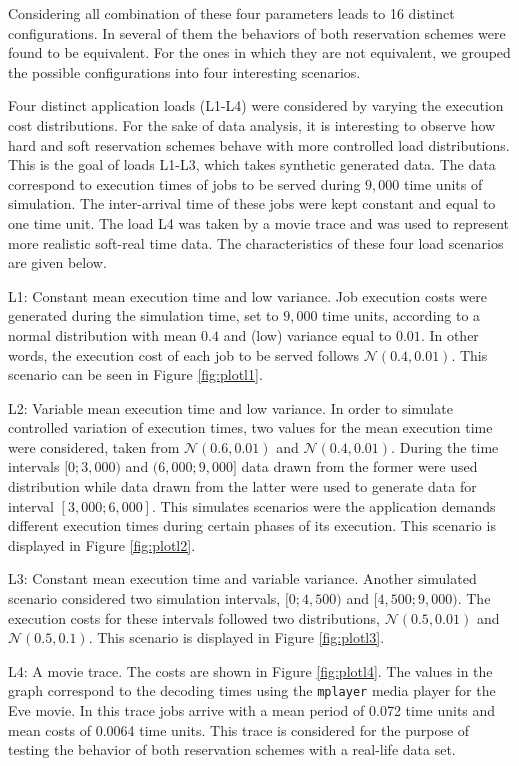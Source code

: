 \documentclass[times, 10pt,twocolumn]{article}
\begin{document}
Considering all combination of these four parameters leads to 16
distinct configurations. In several of them the behaviors of both
reservation schemes were found to be equivalent.  For the ones in
which they are not equivalent, we grouped the possible configurations
into four interesting scenarios.

\label{sec:charact-server-load}

Four distinct application loads (L1-L4) were considered by varying the
execution cost distributions.  For the sake of data analysis, it is
interesting to observe how hard and soft reservation schemes behave
with more controlled load distributions. This is the goal of loads
L1-L3, which takes synthetic generated data. The data correspond to
execution times of jobs to be served during $9,000$ time units of
simulation.  The inter-arrival time of these jobs were kept constant
and equal to one time unit.  The load L4 was taken by a movie trace
and was used to represent more realistic soft-real time data. The
characteristics of these four load scenarios are given below.

\begin{description}
\item L1: Constant mean execution time and low variance. Job execution
  costs were generated during the simulation time, set to $9,000$ time
  units, according to a normal distribution with mean $0.4$ and (low)
  variance equal to $0.01$. In other words, the execution cost of each
  job to be served follows $\mathcal{N}(0.4,0.01)$. This scenario can
  be seen in Figure \ref{fig:plotl1}.
\item L2: Variable mean execution time and low variance.  In order to
  simulate controlled variation of execution times, two values for the
  mean execution time were considered, taken from
  $\mathcal{N}(0.6,0.01)$ and $\mathcal{N}(0.4,0.01)$. During the time
  intervals $[0;3,000)$ and $(6,000;9,000]$ data drawn from the former
  were used distribution while data drawn from the latter were used to
  generate data for interval $[3,000;6,000]$. This simulates scenarios
  were the application demands different execution times during
  certain phases of its execution. This scenario is displayed in
  Figure \ref{fig:plotl2}.
\item L3: Constant mean execution time and variable variance.  Another
  simulated scenario considered two simulation intervals, $[0;4,500)$
  and $[4,500;9,000)$.  The execution costs for these intervals
  followed two distributions, $\mathcal{N}(0.5,0.01)$ and
  $\mathcal{N}(0.5,0.1)$. This scenario is displayed in Figure
  \ref{fig:plotl3}.
\item L4: A movie trace. The costs are shown in Figure
  \ref{fig:plotl4}. The values in the graph correspond to the decoding
  times using the \texttt{mplayer} media player for the Eve movie. In
  this trace jobs arrive with a mean period of 0.072 time units and
  mean costs of 0.0064 time units. This trace is considered for the
  purpose of testing the behavior of both reservation schemes with a
  real-life data set.
\end{description}
\end{document}
